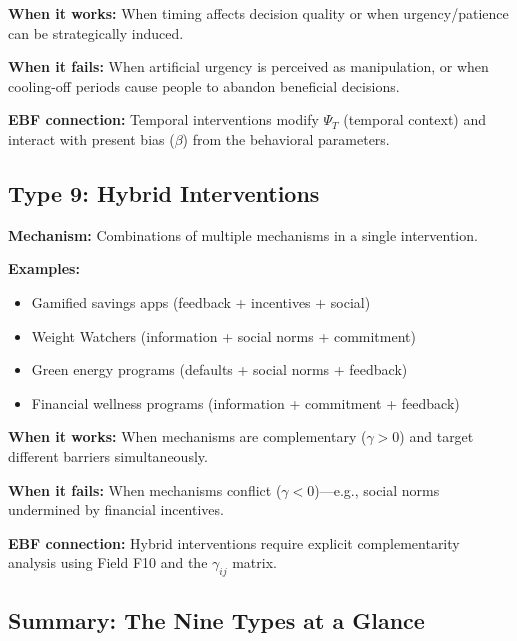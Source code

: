 \textbf{When it works:} When timing affects decision quality or when urgency/patience can be strategically induced.

\textbf{When it fails:} When artificial urgency is perceived as manipulation, or when cooling-off periods cause people to abandon beneficial decisions.

\textbf{EBF connection:} Temporal interventions modify $\Psi_T$ (temporal context) and interact with present bias ($\beta$) from the behavioral parameters.

\subsection{Type 9: Hybrid Interventions}

\textbf{Mechanism:} Combinations of multiple mechanisms in a single intervention.

\textbf{Examples:}
\begin{itemize}[nosep]
\item Gamified savings apps (feedback + incentives + social)
\item Weight Watchers (information + social norms + commitment)
\item Green energy programs (defaults + social norms + feedback)
\item Financial wellness programs (information + commitment + feedback)
\end{itemize}

\textbf{When it works:} When mechanisms are complementary ($\gamma > 0$) and target different barriers simultaneously.

\textbf{When it fails:} When mechanisms conflict ($\gamma < 0$)---e.g., social norms undermined by financial incentives.

\textbf{EBF connection:} Hybrid interventions require explicit complementarity analysis using Field F10 and the $\gamma_{ij}$ matrix.

\subsection{Summary: The Nine Types at a Glance}

